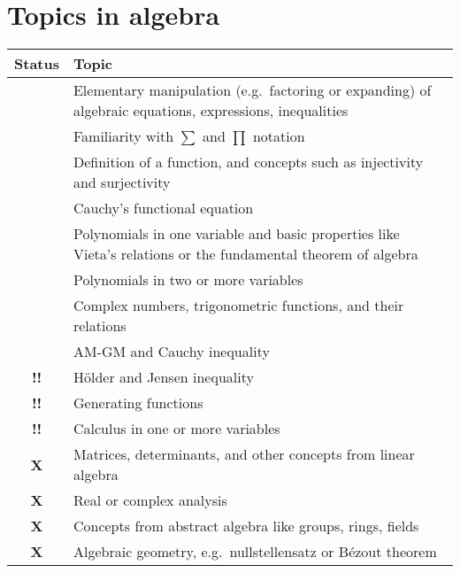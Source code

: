 \documentclass[11pt]{scrartcl}
\providecommand{\isRq}{{\color{green!60!black}\CheckmarkBold}}
\providecommand{\isAv}{{\color{gray}\sffamily\bfseries !!}}
\providecommand{\isEx}{{\color{red}\sffamily\bfseries X}}
\begin{document}
\section{Topics in algebra}
\begin{center}
	\begin{tabular}{cp{12cm}}
	\toprule Status & Topic \\ \midrule
	\isRq & Elementary manipulation (e.g.\ factoring or expanding)
		of algebraic equations, expressions, inequalities \\
	\isRq & Familiarity with $\sum$ and $\prod$ notation \\
	\isRq & Definition of a function, and concepts such as injectivity and surjectivity \\
	\isRq & Cauchy's functional equation \\
	\isRq & Polynomials in one variable and basic properties
		like Vieta's relations or the fundamental theorem of algebra \\
	\isRq & Polynomials in two or more variables \\
	\isRq & Complex numbers, trigonometric functions, and their relations \\
	\isRq & AM-GM and Cauchy inequality \\
	\isAv & H\"{o}lder and Jensen inequality \\
	\isAv & Generating functions \\
	\isAv & Calculus in one or more variables \\
	\isEx & Matrices, determinants, and other concepts from linear algebra \\
	\isEx & Real or complex analysis \\
	\isEx & Concepts from abstract algebra like groups, rings, fields \\
	\isEx & Algebraic geometry, e.g.\ nullstellensatz or B\'{e}zout theorem \\
	\bottomrule
	\end{tabular}
\end{center}
\end{document}
